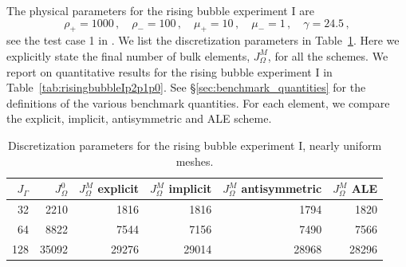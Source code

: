 \documentclass[a4paper,12pt,onecolumn]{article}
\begin{document}
The physical parameters for the rising bubble experiment I are
\begin{equation} \label{eq:Hysing1}
\rho_+ = 1000\,,\quad \rho_- = 100\,,\quad \mu_+ = 10\,,\quad \mu_- = 1\,,\quad
\gamma = 24.5\,,
\end{equation}
see the test case 1 in \cite[Table~I]{HysingTKPBGT09}. We list the
discretization parameters in Table~\ref{tab:risingbubble2Delements}. Here we
explicitly state the final number of bulk elements, $J_\Omega^M$, for all the
schemes. We report on quantitative results for the rising bubble experiment I
in Table~\ref{tab:risingbubbleIp2p1p0}. See \S\ref{sec:benchmark_quantities}
for the definitions of the various benchmark quantities. For each element, we
compare the explicit, implicit, antisymmetric and ALE scheme.
\begin{table}
\center
\begin{tabular}{rrrrrr}
\hline
$J_\Gamma$ & $J_\Omega^0$ & $J_\Omega^M$ explicit & $J_\Omega^M$ implicit &
$J_\Omega^M$ antisymmetric & $J_\Omega^M$ ALE \\
\hline
 32 &  2210 &  1816 &  1816 &  1794 &  1820 \\
 64 &  8822 &  7544 &  7156 &  7490 &  7566 \\
128 & 35092 & 29276 & 29014 & 28968 & 28296 \\
\hline
\end{tabular}
\caption[Navier--Stokes rising bubble I meshes parameters]
{Discretization parameters for the rising bubble experiment I, nearly uniform
meshes.}
\label{tab:risingbubble2Delements}
\end{table}
\end{document}
